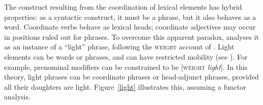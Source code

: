 The construct resulting from the coordination of lexical elements has hybrid properties: as a syntactic construct, it must be a phrase, but it also behaves as a word. Coordinate verbs behave as lexical heads; coordinate adjectives may occur in positions ruled out for phrases. To overcome this apparent paradox, \citet[Section~5.1]{Abeille:06} analyses it as an instance of a ``light'' phrase, following the \textsc{weight} account of \citet{Abeille:Godard:2000, Abeille:Godard:2004}. Light elements can be words or phrases, and can have restricted mobility (see ). For example, prenominal modifiers can be constrained to be [\textsc{weight} \emph{light}]. In this theory, light phrases can be coordinate phrases or head-adjunct phrases, provided all their daughters are light. Figure~\ref{light} illustrates this, assuming a functor analysis.

